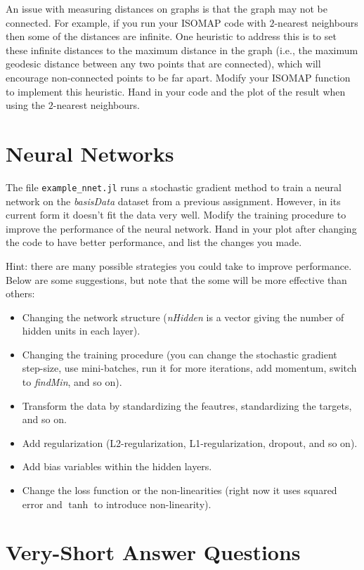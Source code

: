 \documentclass{article}
\def\blu#1{{\color{blu}#1}}
\def\items#1{\begin{itemize}#1\end{itemize}}
\begin{document}
An issue with measuring distances on graphs is that the graph may not be connected. For example, if you run your ISOMAP code with $2$-nearest neighbours then some of the distances are infinite. One heuristic to address this is to set these infinite distances to the maximum distance in the graph (i.e., the maximum geodesic distance between any two points that are connected), which will encourage non-connected points to be far apart. Modify your ISOMAP function to implement this heuristic. \blu{Hand in your code and the plot of the result when using the $2$-nearest neighbours}.



\section{Neural Networks}


The file \texttt{example\_nnet.jl} runs a stochastic gradient method to train a neural network on the \emph{basisData} dataset from a previous assignment. However, in its current form it doesn't fit the data very well. Modify the training procedure to improve the performance of the neural network. \blu{Hand in your plot after changing the code to have better performance, and list the changes you made}.

Hint: there are many possible strategies you could take to improve performance. Below are some suggestions, but note that the some will be more effective than others:
\items{
\item Changing the network structure (\emph{nHidden} is a vector giving the number of hidden units in each layer).
\item Changing the training procedure (you can change the stochastic gradient step-size, use mini-batches, run it for more iterations, add momentum, switch to \emph{findMin}, and so on).
\item Transform the data by standardizing the feautres, standardizing the targets, and so on.
\item Add regularization (L2-regularization, L1-regularization, dropout, and so on).
\item Add bias variables within the hidden layers.
\item Change the loss function or the non-linearities (right now it uses squared error and $\tanh$ to introduce non-linearity).
}



\section{Very-Short Answer Questions}
\end{document}
